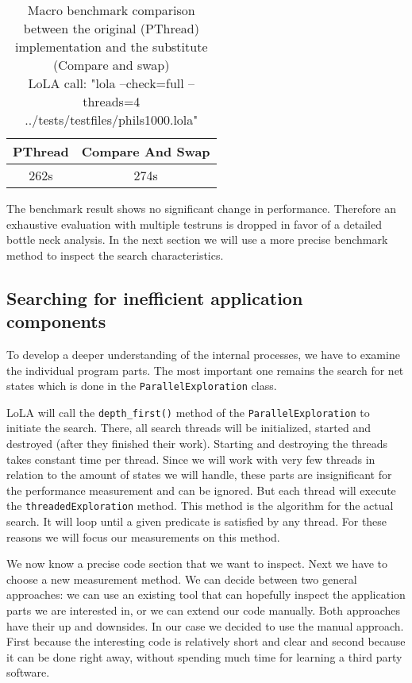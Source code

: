 \begin{center}
    \begin{table}[H]
        \centering
        \begin{tabular}{| c | c |}
            \hline
            \textbf{PThread} & \textbf{Compare And Swap} \\ \hline
            262s & 274s \\ \hline
        \end{tabular}
        \caption{Macro benchmark comparison between the original (PThread) implementation and the substitute (Compare and swap)\\ LoLA call: "lola --check=full --threads=4 ../tests/testfiles/phils1000.lola" }
    \end{table}
\end{center}

The benchmark result shows no significant change in performance. Therefore an exhaustive evaluation with multiple testruns is dropped in favor of a detailed bottle neck analysis. In the next section we will use a more precise benchmark method to inspect the search characteristics.

\subsection{Searching for inefficient application components}
To develop a deeper understanding of the internal processes, we have to examine the individual program parts. The most important one remains the search for net states which is done in the \texttt{ParallelExploration} class.

LoLA will call the \texttt{depth\_first()} method of the \texttt{ParallelExploration} to initiate the search. There, all search threads will be initialized, started and destroyed (after they finished their work). Starting and destroying the threads takes constant time per thread. Since we will work with very few threads in relation to the amount of states we will handle, these parts are insignificant for the performance measurement and can be ignored. But each thread will execute the \texttt{threadedExploration} method. This method is the algorithm for the actual search. It will loop until a given predicate is satisfied by any thread. For these reasons we will focus our measurements on this method.

We now know a precise code section that we want to inspect. Next we have to choose a new measurement method. We can decide between two general approaches: we can use an existing tool that can hopefully inspect the application parts we are interested in, or we can extend our code manually. Both approaches have their up and downsides. In our case we decided to use the manual approach. First because the interesting code is relatively short and clear and second because it can be done right away, without spending much time for learning a third party software.

